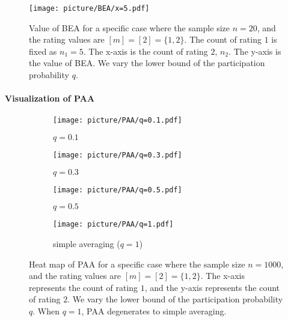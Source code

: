 \begin{figure}[H]
  \centering
  \texttt{[image: picture/BEA/x=5.pdf]}
  \caption{Value of BEA for a specific case where the sample size $n=20$, and the rating values are \([m]=[2]=\{1, 2\}\). The count of rating $1$ is fixed as $n_1=5$. The x-axis is the count of rating $2$, $n_2$. The y-axis is the value of BEA. We vary the lower bound of the participation probability \( q \).}
  \label{fig:BEA_value}
\end{figure}



\paragraph{Visualization of PAA}

\begin{figure}[h]
  \centering
  \begin{subfigure}[b]{0.23\textwidth}
    \centering
    \texttt{[image: picture/PAA/q=0.1.pdf]}
    \caption{$q=0.1$}
  \end{subfigure}
  \hspace{0.005\textwidth}
  \begin{subfigure}[b]{0.23\textwidth}
    \centering
    \texttt{[image: picture/PAA/q=0.3.pdf]}
    \caption{$q=0.3$}
  \end{subfigure}
  
  \vspace{0.01\textheight} %
  
  \begin{subfigure}[b]{0.23\textwidth}
    \centering
    \texttt{[image: picture/PAA/q=0.5.pdf]} 
     \caption{$q=0.5$}
  \end{subfigure}
  \hspace{0.005\textwidth}
  \begin{subfigure}[b]{0.23\textwidth}
    \centering
    \texttt{[image: picture/PAA/q=1.pdf]}     \caption{simple averaging ($q=1$)}
  \end{subfigure}

  \caption{Heat map of PAA for a specific case where the sample size $n=1000$, and the rating values are \([m]=[2]=\{1, 2\}\). The x-axis represents the count of rating \(1\), and the y-axis represents the count of rating \(2\). We vary the lower bound of the participation probability \( q \). When \( q = 1 \), PAA degenerates to simple averaging.}
  \label{fig:PAA_heatmap}
\end{figure}


